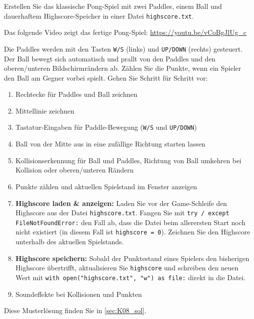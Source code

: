 \begin{myexercise}\label{myexercise:HighscoreTxt}
    Erstellen Sie das klassische Pong-Spiel mit zwei Paddles, einem Ball und dauerhaftem Highscore-Speicher in einer Datei \texttt{highscore.txt}.

    Das folgende Video zeigt das fertige Pong-Spiel: \url{https://youtu.be/vCoBgJlUg_c}

    Die Paddles werden mit den Tasten \lstinline|W/S| (links) und \lstinline|UP/DOWN| (rechts) gesteuert. Der Ball bewegt sich automatisch und prallt von den Paddles und den oberen/unteren Bildschirmrändern ab. Zählen Sie die Punkte, wenn ein Spieler den Ball am Gegner vorbei spielt. Gehen Sie Schritt für Schritt vor:
    \begin{enumerate}
        \item Rechtecke für Paddles und Ball zeichnen
        \item Mittellinie zeichnen
        \item Tastatur-Eingaben für Paddle-Bewegung (\texttt{W/S} und \texttt{UP/DOWN})
        \item Ball von der Mitte aus in eine zufällige Richtung starten lassen
        \item Kollisionserkennung für Ball und Paddles, Richtung von Ball umkehren bei Kollision oder oberen/unteren Rändern
        \item Punkte zählen und aktuellen Spielstand im Fenster anzeigen
        \item \textbf{Highscore laden \& anzeigen:} Laden Sie vor der Game-Schleife den Highscore aus der Datei \texttt{highscore.txt}. Fangen Sie mit \lstinline|try / except FileNotFoundError:| den Fall ab, dass die Datei beim allerersten Start noch nicht existiert (in diesem Fall ist \lstinline|highscore = 0|). Zeichnen Sie den Highscore unterhalb des aktuellen Spielstands.
        \item \textbf{Highscore speichern:} Sobald der Punktestand eines Spielers den bisherigen Highscore übertrifft, aktualisieren Sie \lstinline|highscore| und schreiben den neuen Wert mit \lstinline|with open("highscore.txt", "w") as file:| direkt in die Datei.
        \item Soundeffekte bei Kollisionen und Punkten
    \end{enumerate}
    \begin{myanswer}
        Diese Musterlösung finden Sie in \cref{sec:K08_sol}.
    \end{myanswer}
\end{myexercise}


